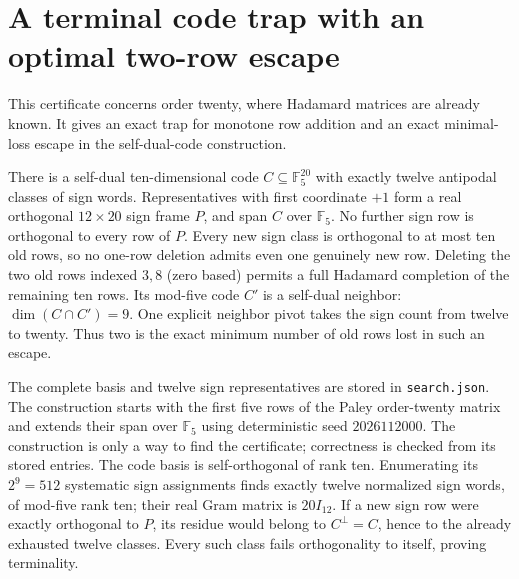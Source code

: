 \section{A terminal code trap with an optimal two-row escape}

This certificate concerns order twenty, where Hadamard matrices are
already known. It gives an exact trap for monotone row addition and
an exact minimal-loss escape in the self-dual-code construction.

\begin{theorem}
There is a self-dual ten-dimensional code $C\subseteq\mathbb F_5^{20}$
with exactly twelve antipodal classes of sign words. Representatives
with first coordinate $+1$ form a real orthogonal $12\times20$ sign
frame $P$, and span $C$ over $\mathbb F_5$.
No further sign row is orthogonal to every row of $P$.
Every new sign class is orthogonal to at most ten old rows, so no
one-row deletion admits even one genuinely new row.
Deleting the two old rows indexed $3,8$ (zero based) permits a full
Hadamard completion of the remaining ten rows. Its mod-five code
$C'$ is a self-dual neighbor: $\dim(C\cap C')=9$.
One explicit neighbor pivot takes the sign count from twelve to twenty.
Thus two is the exact minimum number of old rows lost in such an escape.
\end{theorem}

The complete basis and twelve sign representatives are stored in
\texttt{search.json}. The construction starts with the first five rows
of the Paley order-twenty matrix and extends their span over
$\mathbb F_5$ using deterministic seed $2026112000$.
The construction is only a way to find the certificate; correctness
is checked from its stored entries. The code basis is self-orthogonal
of rank ten. Enumerating its $2^9=512$ systematic sign assignments
finds exactly twelve normalized sign words, of mod-five rank ten;
their real Gram matrix is $20I_{12}$.
If a new sign row were exactly orthogonal to $P$, its residue would
belong to $C^\perp=C$, hence to the already exhausted twelve classes.
Every such class fails orthogonality to itself, proving terminality.

